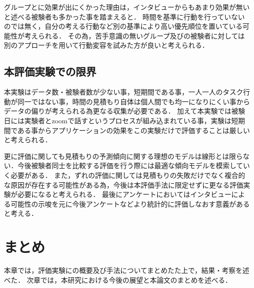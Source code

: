 グループとに効果が出にくかった理由は，インタビューからもあまり効果が無いと述べる被験者も多かった事を踏まえると．
時間を基準に行動を行っていないのでは無く，自分の考える行動など別の基準により高い優先順位を置いている可能性が考えられる．
その為，苦手意識の無いグループ及びの被験者に対しては別のアプローチを用いて行動変容を試みた方が良いと考えられる．
\subsection{本評価実験での限界}
本実験はデータ数・被験者数が少ない事，短期間である事，一人一人のタスク行動が同一ではない事，時間の見積もり自体は個人間でも均一になりにくい事からデータの偏りが考えられる為更なる収集が必要である．
加えて本実験では被験日には実験者とzoomで話すというプロセスが組み込まれている事，実験は短期間である事からアプリケーションの効果をこの実験だけで評価することは厳しいと考えられる．

更に評価に関しても見積もりの予測傾向に関する理想のモデルは線形とは限らない．今後被験者同士を比較する評価を行う際には最適な傾向モデルを模索していく必要がある．
また，ずれの評価に関しては見積もりの失敗だけでなく複合的な原因が存在する可能性がある為，今後は本評価手法に限定せずに更なる評価実験が必要になると考えられる．
最後にアンケートにおいてはインタビューによる可能性の示唆を元に今後アンケートなどより統計的に評価しなおす意義があると考える．

\section{まとめ}
本章では，評価実験にの概要及び手法についてまとめたた上で，結果・考察を述べた．
次章では，本研究における今後の展望と本論文のまとめを述べる．
